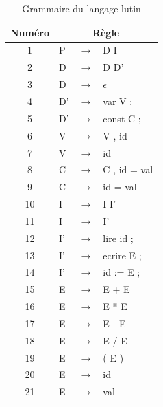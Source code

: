 \begin{table}[h]
	\centering
	\begin{tabular}{|c|l c l|}
		\hline
		Numéro & \multicolumn{3}{c|}{Règle} \\
		\hline
		1 & P & $\rightarrow$ & D I \\
		2 & D & $\rightarrow$ & D D’ \\
		3 & D & $\rightarrow$ & $\epsilon$ \\
		4 & D’ & $\rightarrow$ & var V ; \\
		5 & D’ & $\rightarrow$ & const C ; \\
		6 & V & $\rightarrow$ & V , id \\
		7 & V & $\rightarrow$ & id \\
		8 & C & $\rightarrow$ & C , id = val \\
		9 & C & $\rightarrow$ & id = val \\
		10 & I & $\rightarrow$ & I I’ \\
		11 & I & $\rightarrow$ & I’ \\
		12 & I’ & $\rightarrow$ & lire id ; \\
		13 & I’ & $\rightarrow$ & ecrire E ; \\
		14 & I’ & $\rightarrow$ & id := E ; \\
		15 & E & $\rightarrow$ & E + E \\
		16 & E & $\rightarrow$ & E * E \\
		17 & E & $\rightarrow$ & E - E \\
		18 & E & $\rightarrow$ & E / E \\
		19 & E & $\rightarrow$ & ( E ) \\
		20 & E & $\rightarrow$ & id \\
		21 & E & $\rightarrow$ & val \\
		\hline
	\end{tabular}
	\caption{Grammaire du langage lutin}
	\label{tab:grammaire}
\end{table}

